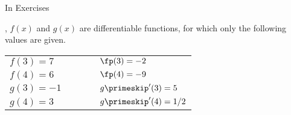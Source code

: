 {\noindent In Exercises}
{, $f(x)$ and $g(x)$ are differentiable functions, for which only the following values are given.
\begin{center}
\begin{tabular}{lllll}
$f(3) = 7$ &&&& $\fp(3) = -2$\\
$f(4) = 6$ &&&& $\fp(4) = -9$\\
$g(3) = -1$ &&&& $g\primeskip'(3) = 5$\\
$g(4) = 3$ &&&& $g\primeskip'(4) = 1/2$\\
\end{tabular}
\end{center}
}
